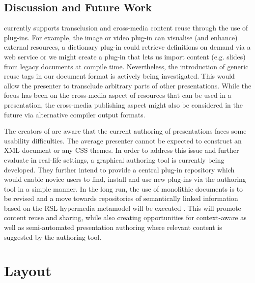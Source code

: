    \subsection{Discussion and Future Work}

    \mxp currently supports transclusion and cross-media content reuse through
    the use of plug-ins. For example, the image or video plug-in can visualise
    (and enhance) external resources, a dictionary plug-in could retrieve
    definitions on demand via a web service or we might create a plug-in that
    lets us import content (e.g. \ppt slides) from legacy documents at compile
    time. Nevertheless, the introduction of generic reuse tags in our document
    format is actively being investigated. This would allow the presenter to
    transclude arbitrary parts of other \mxp presentations. While the focus has
    been on the cross-media aspect of resources that can be used in a
    presentation, the cross-media publishing aspect might also be considered in
    the future via alternative compiler output formats.

    The creators of \mxp are aware that the current authoring of \mxp
    presentations faces some usability difficulties. The average presenter
    cannot be expected to construct an XML document or any CSS themes. In order
    to address this issue and further evaluate \mxp in real-life settings, a
    graphical \mxp authoring tool is currently being developed. They further
    intend to provide a central plug-in repository which would enable novice
    users to find, install and use new plug-ins via the authoring tool in a
    simple manner. In the long run, the use of monolithic documents is to be
    revised and a move towards repositories of semantically linked information
    based on the RSL hypermedia metamodel will be executed \citep{signer-3}.
    This will promote content reuse and sharing, while also creating
    opportunities for context-aware as well as semi-automated presentation
    authoring where relevant content is suggested by the authoring tool.

  \section{Layout}

